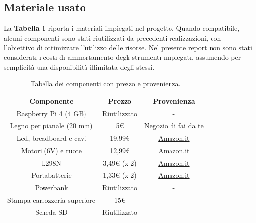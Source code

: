 \documentclass{article}
\begin{document}
\subsection{Materiale usato}
La \textbf{Tabella 1} riporta i materiali impiegati nel progetto. Quando compatibile, alcuni componenti sono stati riutilizzati da precedenti realizzazioni, con l’obiettivo di ottimizzare l’utilizzo delle risorse. Nel presente report non sono stati considerati i costi di ammortamento degli strumenti impiegati, assumendo per semplicità una disponibilità illimitata degli stessi.
\begin{table}[h!]
\centering
\begin{tabular}{|c|c|c|}
\hline
\textbf{Componente} & \textbf{Prezzo} & \textbf{Provenienza} \\
\hline
Raspberry Pi 4 (4 GB) & Riutilizzato & - \\
Legno per pianale (20 mm) & 5€ & Negozio di fai da te \\
Led, breadboard e cavi & 19,99€ & \href{https://www.amazon.it/dp/B01MQIO78W}{Amazon.it} \\
Motori (6V) e ruote & 12,99€ & \href{https://www.amazon.it/dp/B096Z5C3R4}{Amazon.it} \\
L298N & 3,49€ (x 2) & \href{https://www.amazon.it/dp/B08K3886W7}{Amazon.it} \\
Portabatterie & 1,33€ (x 2) & \href{https://www.amazon.it/dp/B07WJ3HFSP}{Amazon.it} \\
Powerbank & Riutilizzato & - \\
Stampa carrozzeria superiore & 15€ & - \\
Scheda SD & Riutilizzato & - \\
\hline
\end{tabular}
\caption{Tabella dei componenti con prezzo e provenienza.}
\label{tab:componenti}
\end{table}
\end{document}
